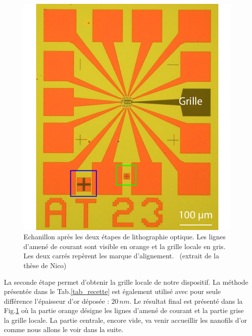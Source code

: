 \begin{figure}
\parbox{6.5cm}{
\includegraphics[scale=0.45]{Fabrication/LithoOptique/LithoOptique.pdf} 
}
\parbox{7cm}{\caption{Echanillon après les deux étapes de lithographie optique. Les lignes d'amené de courant sont visible en orange et la grille locale en gris. Les deux carrés repèrent les marque d'alignement. ~(extrait de la thèse de Nico)}
\label{LithoOptique}
}
\end{figure}

La seconde étape permet d'obtenir la grille locale de notre dispositif. La méthode présentée dans le Tab.\ref{tab_recette} est également utilisé avec pour seule différence l'épaisseur d'or déposée : $20\,nm$. Le résultat final est présenté dans la Fig.\ref{LithoOptique} où la partie orange désigne les lignes d'amené de courant et la partie grise la grille locale. La partie centrale, encore vide, va venir accueillir les nanofils d'or comme nous allons le voir dans la suite.


